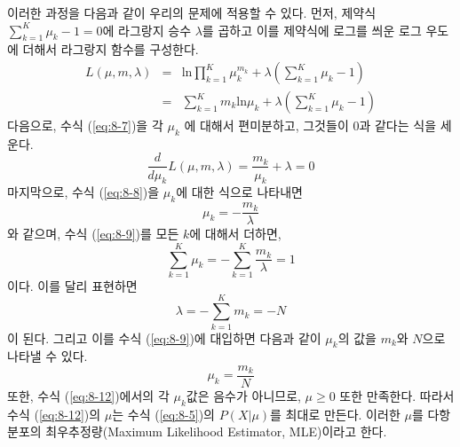 \documentclass[a4paper]{oblivoir}
\begin{document}
이러한 과정을 다음과 같이 우리의 문제에 적용할 수 있다. 먼저, 제약식 $\sum_{k=1}^{K} \mu_k - 1 = 0$에 라그랑지 승수 $\lambda$를 곱하고 이를 제약식에 로그를 씌운 로그 우도에 더해서 라그랑지 함수를 구성한다. 
\begin{eqnarray}
L(\mu, m, \lambda) & = &  \textrm{ln} \prod_{k=1}^{K} \mu_{k}^{m_k} + \lambda (\sum_{k=1}^{K} \mu_k - 1) \nonumber \\
& = & \sum_{k=1}^{K} m_{k} \textrm{ln} \mu_{k} + \lambda (\sum_{k=1}^{K} \mu_k - 1)  \label{eq:8-7} 
\end{eqnarray}
다음으로, 수식 (\ref{eq:8-7})을 각 $\mu_k$ 에 대해서 편미분하고, 그것들이 0과 같다는 식을 세운다. 
\begin{equation}
\frac{d}{d \mu_{k}}L(\mu, m, \lambda)  =  \frac{m_k}{\mu_k} + \lambda = 0  \label{eq:8-8} 
\end{equation}
마지막으로, 수식 (\ref{eq:8-8})을 $\mu_k$에 대한 식으로 나타내면
\begin{equation}
\mu_k =  - \frac{m_k}{\lambda} \label{eq:8-9} 
\end{equation}
와 같으며, 수식 (\ref{eq:8-9})를 모든 $k$에 대해서 더하면, 
\begin{equation}
\sum_{k=1}^{K} \mu_k =  - \sum_{k=1}^{K} \frac{m_k}{\lambda} = 1 \label{eq:8-10} 
\end{equation}
이다. 이를 달리 표현하면
\begin{equation}
\lambda = - \sum_{k=1}^{K} m_k = -N \label{eq:8-11} 
\end{equation}
이 된다. 그리고 이를 수식 (\ref{eq:8-9})에 대입하면 다음과 같이 $\mu_k$의 값을 $m_k$와 $N$으로 나타낼 수 있다.  
\begin{equation}
\mu_k =  \frac{m_k}{N} \label{eq:8-12} 
\end{equation}
또한, 수식 (\ref{eq:8-12})에서의 각 $\mu_k$값은 음수가 아니므로, $\mu \geq 0$ 또한 만족한다. 따라서 수식 (\ref{eq:8-12})의 $\mu$는 수식 (\ref{eq:8-5})의 $P(X|\mu)$를 최대로 만든다. 이러한 $\mu$를 다항 분포의 최우추정량(Maximum Likelihood Estimator, MLE)이라고 한다. \\
\end{document}
